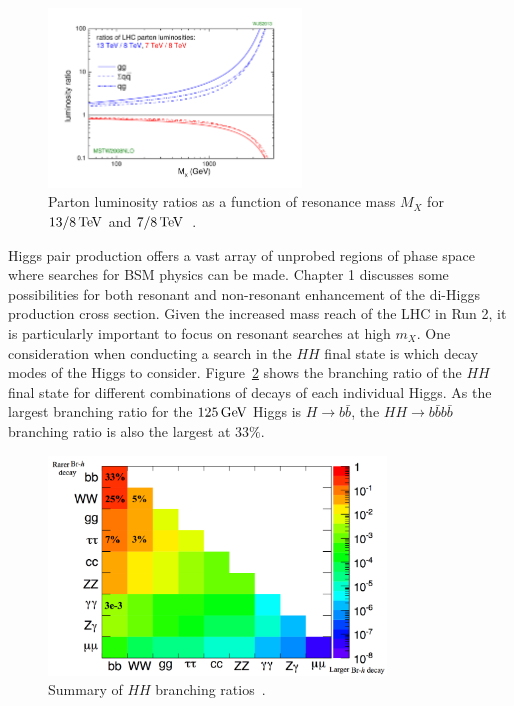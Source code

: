 \begin{figure}[h!]
  \centering
  \captionsetup{justification=centering}

  \includegraphics[width=0.6\textwidth,angle=270]{figures/Stirling_lumi_ratios}
  \caption{Parton luminosity ratios as a function of resonance mass $M_{X}$ for $13/8 \TeV$ and $7/8 \TeV$~\cite{LumiRatio}.}
  \label{fig:lumi_ratio}
\end{figure}

Higgs pair production offers a vast array of unprobed regions of phase space where searches for BSM physics can be made. Chapter 1 discusses some possibilities for both resonant and non-resonant enhancement of the di-Higgs production cross section. Given the increased mass reach of the LHC in Run 2, it is particularly important to focus on resonant searches at high $m_{X}$. One consideration when conducting a search in the $HH$ final state is which decay modes of the Higgs to consider. Figure~\ref{fig:HH_BR} shows the branching ratio of the $HH$ final state for different combinations of decays of each individual Higgs. As the largest branching ratio for the $125 \GeV$ Higgs is $H\to b\bar{b}$, the $HH\to b\bar{b}b\bar{b}$ branching ratio is also the largest at $33\%$. 

\begin{figure}[h!]
  \centering
  \captionsetup{justification=centering}

  \includegraphics[width=0.8\textwidth]{figures/HH_BR}
  \caption{Summary of $HH$ branching ratios~\cite{HH_BR}.}
  \label{fig:HH_BR}
\end{figure}


